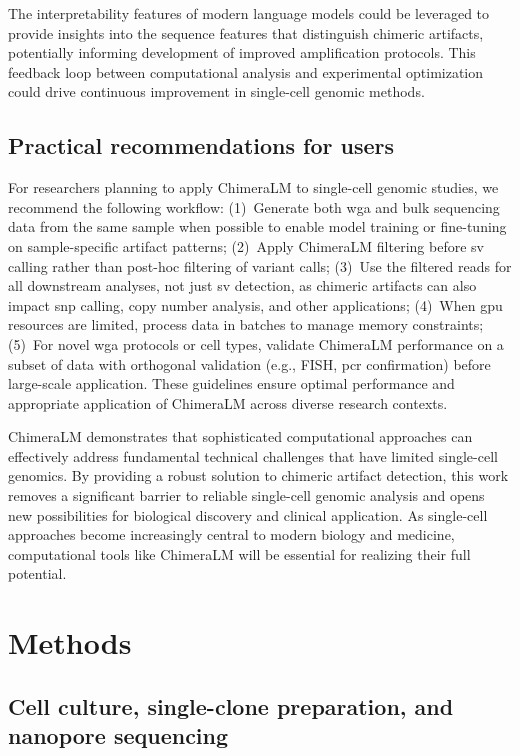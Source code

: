 \documentclass[pdflatex,sn-nature]{sn-jnl}%
\theoremstyle{thmstyleone}%
\theoremstyle{thmstyletwo}%
\theoremstyle{thmstylethree}%
\begin{document}
The interpretability features of modern language models could be leveraged to provide insights into the sequence features that distinguish chimeric artifacts, potentially informing development of improved amplification protocols.
This feedback loop between computational analysis and experimental optimization could drive continuous improvement in single-cell genomic methods.

\subsection*{Practical recommendations for users}

For researchers planning to apply ChimeraLM to single-cell genomic studies, we recommend the following workflow:
(1)~Generate both \gls{wga} and bulk sequencing data from the same sample when possible to enable model training or fine-tuning on sample-specific artifact patterns;
(2)~Apply ChimeraLM filtering before \gls{sv} calling rather than post-hoc filtering of variant calls;
(3)~Use the filtered reads for all downstream analyses, not just \gls{sv} detection, as chimeric artifacts can also impact \gls{snp} calling, copy number analysis, and other applications;
(4)~When \gls{gpu} resources are limited, process data in batches to manage memory constraints;
(5)~For novel \gls{wga} protocols or cell types, validate ChimeraLM performance on a subset of data with orthogonal validation (e.g., FISH, \gls{pcr} confirmation) before large-scale application.
These guidelines ensure optimal performance and appropriate application of ChimeraLM across diverse research contexts.

ChimeraLM demonstrates that sophisticated computational approaches can effectively address fundamental technical challenges that have limited single-cell genomics.
By providing a robust solution to chimeric artifact detection, this work removes a significant barrier to reliable single-cell genomic analysis and opens new possibilities for biological discovery and clinical application.
As single-cell approaches become increasingly central to modern biology and medicine, computational tools like ChimeraLM will be essential for realizing their full potential.

\section*{Methods}\label{sec:methods}

\subsection*{Cell culture, single-clone preparation, and nanopore sequencing}
\end{document}
